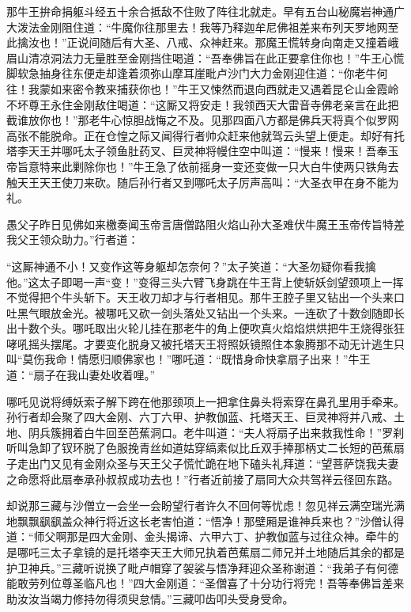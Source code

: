 \documentclass[12pt,UTF8]{ctexbook}
\begin{document}
那牛王拚命捐躯斗经五十余合抵敌不住败了阵往北就走。早有五台山秘魔岩神通广大泼法金刚阻住道：“牛魔你往那里去！我等乃释迦牟尼佛祖差来布列天罗地网至此擒汝也！”正说间随后有大圣、八戒、众神赶来。那魔王慌转身向南走又撞着峨眉山清凉洞法力无量胜至金刚挡住喝道：“吾奉佛旨在此正要拿住你也！”牛王心慌脚软急抽身往东便走却逢着须弥山摩耳崖毗卢沙门大力金刚迎住道：“你老牛何往！我蒙如来密令教来捕获你也！”牛王又悚然而退向西就走又遇着昆仑山金霞岭不坏尊王永住金刚敌住喝道：“这厮又将安走！我领西天大雷音寺佛老亲言在此把截谁放你也！”那老牛心惊胆战悔之不及。见那四面八方都是佛兵天将真个似罗网高张不能脱命。正在仓惶之际又闻得行者帅众赶来他就驾云头望上便走。却好有托塔李天王并哪吒太子领鱼肚药叉、巨灵神将幔住空中叫道：“慢来！慢来！吾奉玉帝旨意特来此剿除你也！”牛王急了依前摇身一变还变做一只大白牛使两只铁角去触天王天王使刀来砍。随后孙行者又到哪吒太子厉声高叫：“大圣衣甲在身不能为礼。

愚父子昨日见佛如来檄奏闻玉帝言唐僧路阻火焰山孙大圣难伏牛魔王玉帝传旨特差我父王领众助力。”行者道：

“这厮神通不小！又变作这等身躯却怎奈何？”太子笑道：“大圣勿疑你看我擒他。”这太子即喝一声“变！”变得三头六臂飞身跳在牛王背上使斩妖剑望颈项上一挥不觉得把个牛头斩下。天王收刀却才与行者相见。那牛王腔子里又钻出一个头来口吐黑气眼放金光。被哪吒又砍一剑头落处又钻出一个头来。一连砍了十数剑随即长出十数个头。哪吒取出火轮儿挂在那老牛的角上便吹真火焰焰烘烘把牛王烧得张狂哮吼摇头摆尾。才要变化脱身又被托塔天王将照妖镜照住本象腾那不动无计逃生只叫“莫伤我命！情愿归顺佛家也！”哪吒道：“既惜身命快拿扇子出来！”牛王道：“扇子在我山妻处收着哩。”

哪吒见说将缚妖索子解下跨在他那颈项上一把拿住鼻头将索穿在鼻孔里用手牵来。孙行者却会聚了四大金刚、六丁六甲、护教伽蓝、托塔天王、巨灵神将并八戒、土地、阴兵簇拥着白牛回至芭蕉洞口。老牛叫道：“夫人将扇子出来救我性命！”罗刹听叫急卸了钗环脱了色服挽青丝如道姑穿缟素似比丘双手捧那柄丈二长短的芭蕉扇子走出门又见有金刚众圣与天王父子慌忙跪在地下磕头礼拜道：“望菩萨饶我夫妻之命愿将此扇奉承孙叔叔成功去也！”行者近前接了扇同大众共驾祥云径回东路。

却说那三藏与沙僧立一会坐一会盼望行者许久不回何等忧虑！忽见祥云满空瑞光满地飘飘飖飖盖众神行将近这长老害怕道：“悟净！那壁厢是谁神兵来也？”沙僧认得道：“师父啊那是四大金刚、金头揭谛、六甲六丁、护教伽蓝与过往众神。牵牛的是哪吒三太子拿镜的是托塔李天王大师兄执着芭蕉扇二师兄并土地随后其余的都是护卫神兵。”三藏听说换了毗卢帽穿了袈裟与悟净拜迎众圣称谢道：“我弟子有何德能敢劳列位尊圣临凡也！”四大金刚道：“圣僧喜了十分功行将完！吾等奉佛旨差来助汝汝当竭力修持勿得须臾怠情。”三藏叩齿叩头受身受命。
\end{document}
